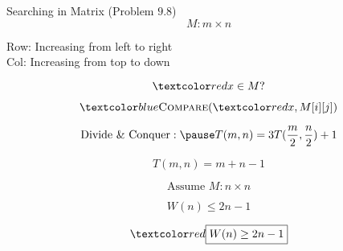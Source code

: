 
\begin{frame}{}
  \centerline{}

\end{frame}

\begin{frame}{}
  \begin{exampleblock}{Searching in Matrix (Problem $9.8$)}
    \[
      M: m \times n
    \]

    \begin{center}
      {Row: Increasing from left to right} \\[6pt]
      {Col: Increasing from top to down}
    \end{center}

    \vspace{-0.50cm}
    \[
      \red{x \in M?}
    \]

	\pause
	\[
	  \blue{\textsc{Compare}(\red{x}, M[i][j])}
	\]
  \end{exampleblock}

  \pause
  \[
	\text{Divide \& Conquer}: \pause T(m,n) = 3T(\frac{m}{2}, \frac{n}{2}) + 1 
  \]

  \pause
  \begin{center}
	{}
  \end{center}

  \pause
  \vspace{-0.30cm}
  \[
    T(m, n) = m + n - 1
  \]
\end{frame}

\begin{frame}{}
  \[
    \text{Assume } M: n \times n 
  \]

  \[
    W(n) \le 2n - 1
  \]

  \pause
  \[
    \red{\boxed{W(n) \ge 2n - 1}}
  \]

  \pause
  \vspace{0.60cm}
  \centerline{}
\end{frame}

